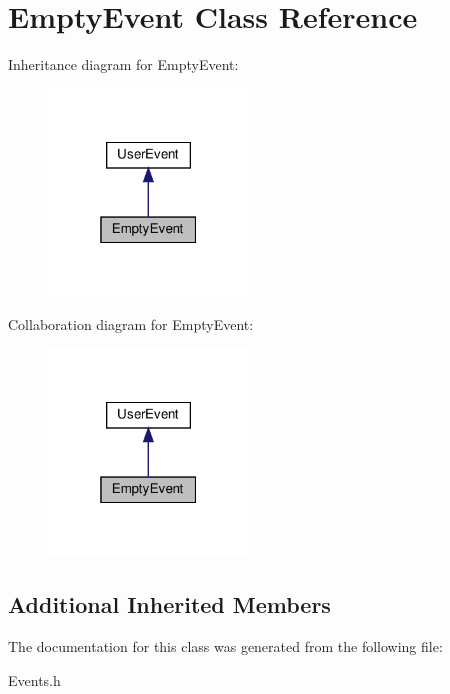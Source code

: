 \hypertarget{classEmptyEvent}{}\section{Empty\+Event Class Reference}
\label{classEmptyEvent}


Inheritance diagram for Empty\+Event\+:\nopagebreak
\begin{figure}[H]
\begin{center}
\leavevmode
\includegraphics[width=151pt]{classEmptyEvent__inherit__graph}
\end{center}
\end{figure}


Collaboration diagram for Empty\+Event\+:\nopagebreak
\begin{figure}[H]
\begin{center}
\leavevmode
\includegraphics[width=151pt]{classEmptyEvent__coll__graph}
\end{center}
\end{figure}
\subsection*{Additional Inherited Members}


The documentation for this class was generated from the following file\+:\begin{DoxyCompactItemize}
\item 
Events.\+h\end{DoxyCompactItemize}
